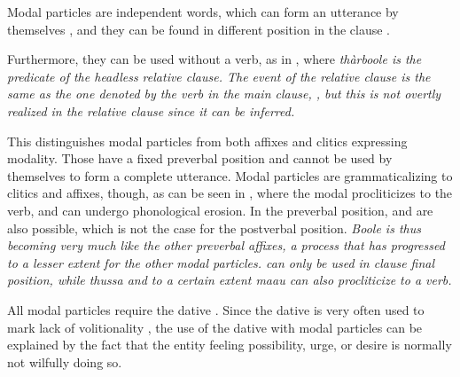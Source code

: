 Modal particles are independent words, which can form an utterance by themselves , and they can be found in different position in the clause .




Furthermore, they can be used without a verb, as in , where \em thàrboole \em is  the predicate of the headless relative clause. The event of the relative clause is the same as the one denoted by the verb in the main clause, , but this is not overtly realized in the relative clause since it can be inferred.



This distinguishes modal particles from both affixes and clitics expressing modality. Those have a fixed preverbal position and cannot be used by themselves to form a complete utterance. Modal particles are grammaticalizing to clitics and affixes, though, as can be seen in  , where the modal procliticizes to the verb, and can undergo phonological erosion. In the preverbal position,  and  are also possible, which is not the case for the postverbal position. \em Boole \em is thus becoming very much like the other preverbal affixes, a process that has progressed to a lesser extent for the other modal particles.   can only be used in clause final position, while \em thussa \em and to a certain extent \em maau \em can also procliticize to a verb.

All modal particles require the dative  \citep[cf][]{Slomanson2008lingua}. Since the dative is very often used to mark lack of volitionality \citep{Ansaldo2005ms}, the use of the dative with modal particles can be explained by the fact that the entity feeling possibility, urge, or desire is normally not wilfully doing so.


